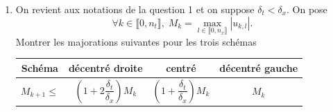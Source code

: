 \begin{enumerate}
\item On revient aux notations de la question 1 et on suppose $\delta_t < \delta_x$. On pose
\[
 \forall k \in \llbracket 0, n_t\rrbracket, \; M_k = \max_{l \in \llbracket 0, n_x\rrbracket} \left| u_{k,l}\right|.
\]
Montrer les majorations suivantes pour les trois schémas
\begin{center}
\renewcommand{\arraystretch}{2.}
\begin{tabular}{|c|c|c|c|} \hline
Schéma        & décentré droite & centré & décentré gauche\\ \hline
$M_{k+1}\leq$ & $\left( 1+2\dfrac{\delta_t}{\delta_x}\right)M_k$  & $\left( 1 + \dfrac{\delta_t}{\delta_x}\right)M_k$ & $M_k$ \\ \hline
\end{tabular}
\end{center}

\end{enumerate}

